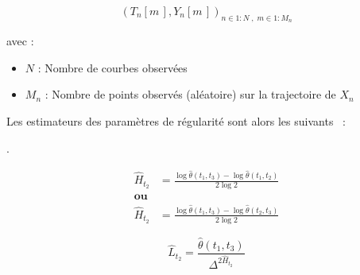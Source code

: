 \begin{equation*}
	( T_n[ m \,], Y_n[ m \,] )_{{n \in 1:N} \; , \; {m \in 1:M_n}}
\end{equation*}

avec :

\begin{itemize}
	\item $N$ : Nombre de courbes observées
	\item $M_n$ : Nombre de points observés (aléatoire) sur la trajectoire de $X_n$
\end{itemize}

Les estimateurs des paramètres de régularité sont alors les suivants ~\cite{maissoro-SmoothnessFTSweakDep}:

\begin{definition}
	.


	\begin{minipage}{0.5\textwidth}
		\begin{align*}
			\hat H_{t_2} & = \frac{ \log \hat \theta(t_1, t_3) - \log \hat \theta(t_1, t_2) }{2 \log 2}
			\\
			\textbf{ou}
			\\
			\hat H_{t_2} & = \frac{ \log \hat \theta(t_1, t_3) - \log \hat \theta(t_2, t_3) }{2 \log 2}
		\end{align*}
	\end{minipage}
	\begin{minipage}{0.5\textwidth}
		\begin{equation*}
			\widehat L_{t_2} = \frac{\widehat \theta(t_1, t_3)}{\Delta^{2 \widehat H_{t_2}}}
		\end{equation*}
	\end{minipage}
\end{definition}

